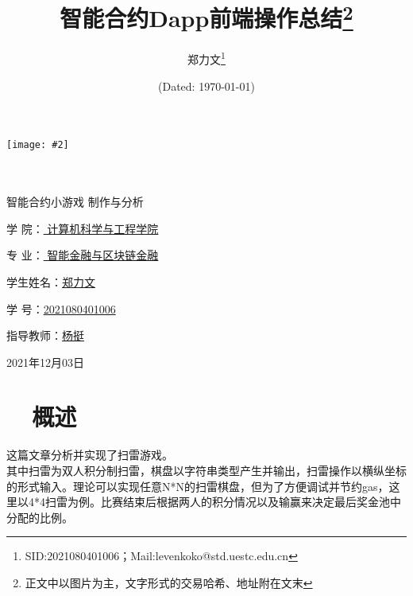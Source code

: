 \documentclass[UTF8]{ctexart}
\title{\textbf{智能合约Dapp前端操作总结\footnote{正文中以图片为主，文字形式的交易哈希、地址附在文末}}}
\author{\sffamily 郑力文\footnote{SID:2021080401006；Mail:levenkoko@std.uestc.edu.cn}}
\date{(Dated: \today)}
\newcommand\picturehere[2][1]{\centerline{\texttt{[image: \#2]}}}
\begin{document}
		\picturehere[0.08]{uestc.png}
\begin{center}
	\quad \\
	\quad \\
	\heiti {} 智能合约小游戏
	\vskip 2cm
	\heiti {} 制作与分析
\end{center}
\vskip 3.5cm

\begin{center}
	\songti \fontsize{15}{15}

	学\hspace{0.93cm} 院：\underline{ 计算机科学与工程学院}

	专\hspace{0.93cm} 业：\underline{ 智能金融与区块链金融 }

	学生姓名：\underline{\qquad \hspace{0.35cm}郑\hspace{0.6cm}力\hspace{0.6cm}文\qquad \hspace{0.8cm}}

	学\hspace{0.93cm} 号：\underline{\qquad \hspace{0.6cm}2021080401006\qquad \hspace{0.8cm}}

	指导教师：\underline{\qquad \hspace{0.45cm}杨\hspace{1.1cm}挺 \hspace{1cm} \qquad}
	\vskip 2cm

	\centerline{2021年12月03日}
\end{center}
	\newpage
	\tableofcontents
	\newpage
	\thispagestyle{fancy}
  \setlength{\parindent}{2em} %
  \section*{\ \ 概述}
  这篇文章分析并实现了扫雷游戏。\\
  \indent 其中扫雷为双人积分制扫雷，棋盘以字符串类型产生并输出，扫雷操作以横纵坐标的形式输入。理论可以实现任意N*N的扫雷棋盘，但为了方便调试并节约gas，这里以4*4扫雷为例。比赛结束后根据两人的积分情况以及输赢来决定最后奖金池中分配的比例。\\
\end{document}
